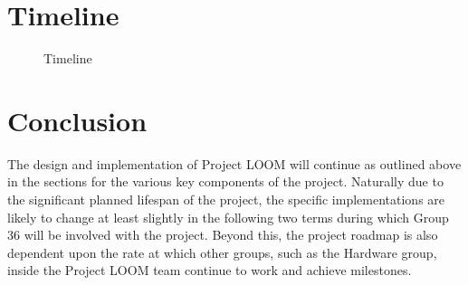 \documentclass[onecolumn, draftclsnofoot,10pt, compsoc]{IEEEtran}
\begin{document}
\section{Timeline}
    \begin{figure}[H]
        \caption{Timeline}
        \label{fig:gantt_chart}
        \noindent{}
    \end{figure}




\section{Conclusion}
    The design and implementation of Project LOOM will continue as outlined above in the sections for the various key components of the project. Naturally due to the significant planned lifespan of the project, the specific implementations are likely to change at least slightly in the following two terms during which Group 36 will be involved with the project. Beyond this, the project roadmap is also dependent upon the rate at which other groups, such as the Hardware group, inside the Project LOOM team continue to work and achieve milestones. 





\end{document}
